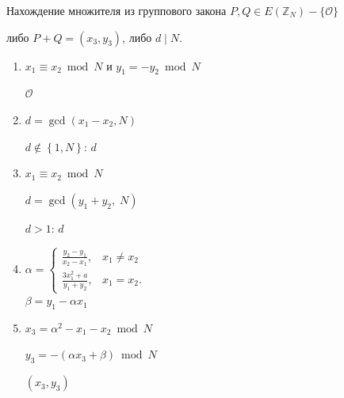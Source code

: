 \documentclass{beamer}
\begin{document}
\begin{frame}{Нахождение множителя из группового закона}
     $P, Q \in E( \mathbb{Z}_N ) - \{\mathcal{O}\}$
    
     либо $P + Q = ( x_3,y_3 )$, либо $d \mid N$. 
    
    \begin{enumerate}
        \item {} $x_1 \equiv x_2\bmod N$ и $y_1 =  - y_2\bmod N$
        
        \quad {} $\mathcal{O}$
        
        \item $d = \gcd(x_1 - x_2, N)$

        \quad {} $d\not  \in \left\{1,N\right\}$:  $d$
        
        \item {} $x_1 \equiv x_2\bmod N$
        
        \quad $d = \gcd (y_1 + y_2,\;N)$
        
        \quad {} $d > 1$:  $d$
        
        \item 
        $
        \alpha =
        \begin{cases}
             \frac{y_2 - y_1}{x_2 - x_1},& x_1 \ne x_2 \\
            \frac{3x_1^2 + a}{y_1 + y_2},& x_1 = x_2.
        \end{cases}
        $\\
        $
        \beta  = y_1 - \alpha x_1
        $
        
        \item $x_3 = \alpha ^2 - x_1 - x_2\bmod N$
        
        $y_3 =  - ( \alpha x_3 + \beta  )\bmod N$
        
         $( x_3, y_3 )$
        
    \end{enumerate}
\end{frame}
\end{document}
